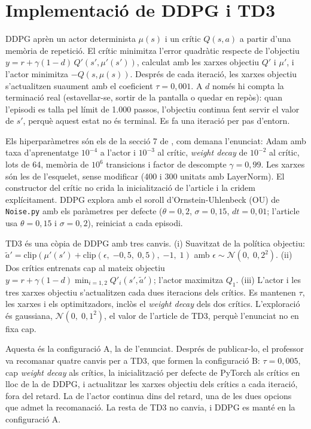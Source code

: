 \section{Implementació de DDPG i TD3}\label{sec:impl}

DDPG \parencite{lillicrap2016} aprèn un actor determinista $\mu(s)$ i un crític $Q(s,a)$ a partir d'una memòria de repetició. El crític minimitza l'error quadràtic respecte de l'objectiu $y = r + \gamma(1-d)\,Q'(s',\mu'(s'))$, calculat amb les xarxes objectiu $Q'$ i $\mu'$, i l'actor minimitza $-Q(s,\mu(s))$. Després de cada iteració, les xarxes objectiu s'actualitzen suaument amb el coeficient $\tau = 0{,}001$. A $d$ només hi compta la terminació real (estavellar-se, sortir de la pantalla o quedar en repòs): quan l'episodi es talla pel límit de 1.000 passos, l'objectiu continua fent servir el valor de $s'$, perquè aquest estat no és terminal. Es fa una iteració per pas d'entorn.

Els hiperparàmetres són els de la secció 7 de \textcite{lillicrap2016}, com demana l'enunciat: Adam amb taxa d'aprenentatge $10^{-4}$ a l'actor i $10^{-3}$ al crític, \emph{weight decay} de $10^{-2}$ al crític, lots de 64, memòria de $10^6$ transicions i factor de descompte $\gamma = 0{,}99$. Les xarxes són les de l'esquelet, sense modificar (400 i 300 unitats amb LayerNorm). El constructor del crític no crida la inicialització de l'article i la cridem explícitament. DDPG explora amb el soroll d'Ornstein-Uhlenbeck (OU) de \texttt{Noise.py} amb els paràmetres per defecte ($\theta = 0{,}2$, $\sigma = 0{,}15$, $dt = 0{,}01$; l'article usa $\theta = 0{,}15$ i $\sigma = 0{,}2$), reiniciat a cada episodi.

TD3 \parencite{fujimoto2018} és una còpia de DDPG amb tres canvis. (i) Suavitzat de la política objectiu: $\tilde a' = \mathrm{clip}(\mu'(s') + \mathrm{clip}(\epsilon,\;{-0{,}5},\;0{,}5),\;{-1},\;1)$ amb $\epsilon \sim \mathcal{N}(0,\;0{,}2^2)$. (ii) Dos crítics entrenats cap al mateix objectiu $y = r + \gamma(1-d)\min_{i=1,2} Q'_i(s',\tilde a')$; l'actor maximitza $Q_1$. (iii) L'actor i les tres xarxes objectiu s'actualitzen cada dues iteracions dels crítics. Es mantenen $\tau$, les xarxes i els optimitzadors, inclòs el \emph{weight decay} dels dos crítics. L'exploració és gaussiana, $\mathcal{N}(0,\;0{,}1^2)$, el valor de l'article de TD3, perquè l'enunciat no en fixa cap.

Aquesta és la configuració A, la de l'enunciat. Després de publicar-lo, el professor va recomanar quatre canvis per a TD3, que formen la configuració B: $\tau = 0{,}005$, cap \emph{weight decay} als crítics, la inicialització per defecte de PyTorch als crítics en lloc de la de DDPG, i actualitzar les xarxes objectiu dels crítics a cada iteració, fora del retard. La de l'actor continua dins del retard, una de les dues opcions que admet la recomanació. La resta de TD3 no canvia, i DDPG es manté en la configuració A.

